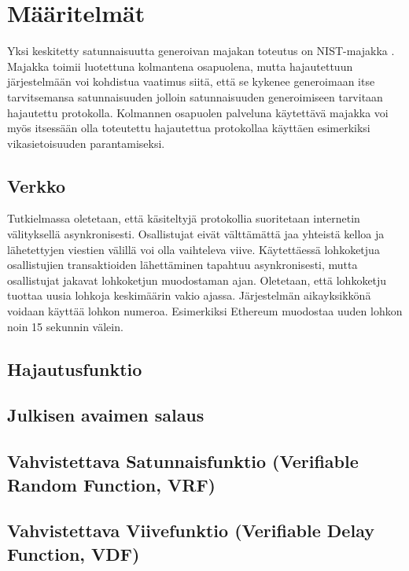 \chapter{Määritelmät\label{methods}}

Yksi keskitetty satunnaisuutta generoivan majakan toteutus on NIST-majakka \cite{computer_security_division_interoperable_2019}. Majakka toimii luotettuna kolmantena osapuolena, mutta hajautettuun järjestelmään voi kohdistua vaatimus siitä, että se kykenee generoimaan itse tarvitsemansa satunnaisuuden jolloin satunnaisuuden generoimiseen tarvitaan hajautettu protokolla. Kolmannen osapuolen palveluna käytettävä majakka voi myös itsessään olla toteutettu hajautettua protokollaa käyttäen esimerkiksi vikasietoisuuden parantamiseksi.

\section{Verkko}
Tutkielmassa oletetaan, että käsiteltyjä protokollia suoritetaan internetin välityksellä asynkronisesti. Osallistujat eivät välttämättä jaa yhteistä kelloa ja lähetettyjen viestien välillä voi olla vaihteleva viive. Käytettäessä lohkoketjua osallistujien transaktioiden lähettäminen tapahtuu asynkronisesti, mutta osallistujat jakavat lohkoketjun muodostaman ajan. Oletetaan, että lohkoketju tuottaa uusia lohkoja keskimäärin vakio ajassa. Järjestelmän aikayksikkönä voidaan käyttää lohkon numeroa. Esimerkiksi Ethereum muodostaa uuden lohkon noin 15 sekunnin välein.

\section{Hajautusfunktio}

\section{Julkisen avaimen salaus}

\section{Vahvistettava Satunnaisfunktio (Verifiable Random Function, VRF)}

\section{Vahvistettava Viivefunktio (Verifiable Delay Function, VDF)}

